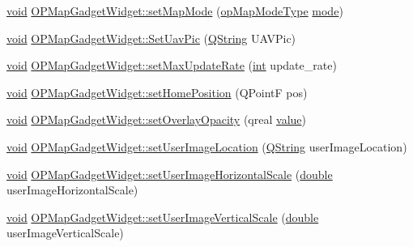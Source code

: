\begin{DoxyCompactItemize}
\item 
\hyperlink{group___u_a_v_objects_plugin_ga444cf2ff3f0ecbe028adce838d373f5c}{void} \hyperlink{group___o_p_map_plugin_gafe9c5443c9ed4947f2072bf8feba9673}{O\-P\-Map\-Gadget\-Widget\-::set\-Map\-Mode} (\hyperlink{group___o_p_map_plugin_ga10cb3e7dfbac87e40e00c1a8c76c16e5}{op\-Map\-Mode\-Type} \hyperlink{glext_8h_a1e71d9c196e4683cc06c4b54d53f7ef5}{mode})
\item 
\hyperlink{group___u_a_v_objects_plugin_ga444cf2ff3f0ecbe028adce838d373f5c}{void} \hyperlink{group___o_p_map_plugin_gaada757b80b86bdf8e272319a861e2f73}{O\-P\-Map\-Gadget\-Widget\-::\-Set\-Uav\-Pic} (\hyperlink{group___u_a_v_objects_plugin_gab9d252f49c333c94a72f97ce3105a32d}{Q\-String} U\-A\-V\-Pic)
\item 
\hyperlink{group___u_a_v_objects_plugin_ga444cf2ff3f0ecbe028adce838d373f5c}{void} \hyperlink{group___o_p_map_plugin_ga865f22d42c30a2446539f03df486e64e}{O\-P\-Map\-Gadget\-Widget\-::set\-Max\-Update\-Rate} (\hyperlink{ioapi_8h_a787fa3cf048117ba7123753c1e74fcd6}{int} update\-\_\-rate)
\item 
\hyperlink{group___u_a_v_objects_plugin_ga444cf2ff3f0ecbe028adce838d373f5c}{void} \hyperlink{group___o_p_map_plugin_ga44a752ab2b6f6b6212e39316b4050683}{O\-P\-Map\-Gadget\-Widget\-::set\-Home\-Position} (Q\-Point\-F pos)
\item 
\hyperlink{group___u_a_v_objects_plugin_ga444cf2ff3f0ecbe028adce838d373f5c}{void} \hyperlink{group___o_p_map_plugin_ga7d642e3ea7bf1e5cd0cc8be6dafc7ba8}{O\-P\-Map\-Gadget\-Widget\-::set\-Overlay\-Opacity} (qreal \hyperlink{glext_8h_aa0e2e9cea7f208d28acda0480144beb0}{value})
\item 
\hyperlink{group___u_a_v_objects_plugin_ga444cf2ff3f0ecbe028adce838d373f5c}{void} \hyperlink{group___o_p_map_plugin_ga7afda7ed24be3606e25a6005fcc881da}{O\-P\-Map\-Gadget\-Widget\-::set\-User\-Image\-Location} (\hyperlink{group___u_a_v_objects_plugin_gab9d252f49c333c94a72f97ce3105a32d}{Q\-String} user\-Image\-Location)
\item 
\hyperlink{group___u_a_v_objects_plugin_ga444cf2ff3f0ecbe028adce838d373f5c}{void} \hyperlink{group___o_p_map_plugin_gab57277e52834ff73fe190391e3b2aa40}{O\-P\-Map\-Gadget\-Widget\-::set\-User\-Image\-Horizontal\-Scale} (\hyperlink{_super_l_u_support_8h_a8956b2b9f49bf918deed98379d159ca7}{double} user\-Image\-Horizontal\-Scale)
\item 
\hyperlink{group___u_a_v_objects_plugin_ga444cf2ff3f0ecbe028adce838d373f5c}{void} \hyperlink{group___o_p_map_plugin_gab9a1ad0c6a406ed144ba3ec120d94d28}{O\-P\-Map\-Gadget\-Widget\-::set\-User\-Image\-Vertical\-Scale} (\hyperlink{_super_l_u_support_8h_a8956b2b9f49bf918deed98379d159ca7}{double} user\-Image\-Vertical\-Scale)

\end{DoxyCompactItemize}
